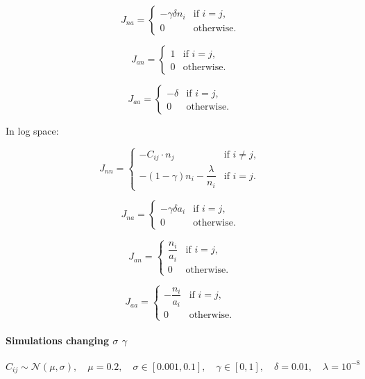 \documentclass[11pt,a4paper,fleqn]{scrartcl}
\begin{document}
\[
J_{na} =
\begin{cases}
- \gamma \delta n_i & \text{if } i = j, \\
0 & \text{otherwise}.
\end{cases}
\]

\[
J_{an} =
\begin{cases}
1 & \text{if } i = j, \\
0 & \text{otherwise}.
\end{cases}
\]

\[
J_{aa} =
\begin{cases}
-\delta & \text{if } i = j, \\
0 & \text{otherwise}.
\end{cases}
\]

\clearpage
In log space:

\[
J_{nn} =
\begin{cases}
- C_{ij} \cdot n_j & \text{if } i \ne j, \\
- (1 - \gamma) n_i - \dfrac{\lambda}{n_i} & \text{if } i = j.
\end{cases}
\]

\[
J_{na} =
\begin{cases}
- \gamma \delta a_i & \text{if } i = j, \\
0 & \text{otherwise}.
\end{cases}
\]

\[
J_{an} =
\begin{cases}
\dfrac{n_i}{a_i} & \text{if } i = j, \\
0 & \text{otherwise}.
\end{cases}
\]

\[
J_{aa} =
\begin{cases}
- \dfrac{n_i}{a_i} & \text{if } i = j, \\
0 & \text{otherwise}.
\end{cases}
\]


\clearpage

\paragraph{Simulations changing $\sigma$ $\gamma$}
\[
C_{ij} \sim \mathcal{N}(\mu, \sigma), \quad 
\mu = 0.2,\quad \sigma \in [0.001, 0.1], \quad 
\gamma \in [0, 1], \quad \delta = 0.01, \quad \lambda = 10^{-8}
\]
\end{document}

